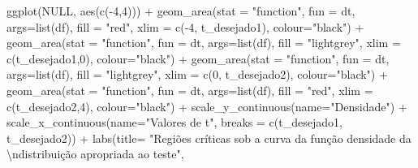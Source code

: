 \documentclass[
]{book}
\newenvironment{Shaded}{\begin{snugshade}}{\end{snugshade}}
\newcommand{\AttributeTok}[1]{\textcolor[rgb]{0.77,0.63,0.00}{#1}}
\newcommand{\ConstantTok}[1]{\textcolor[rgb]{0.00,0.00,0.00}{#1}}
\newcommand{\DecValTok}[1]{\textcolor[rgb]{0.00,0.00,0.81}{#1}}
\newcommand{\FunctionTok}[1]{\textcolor[rgb]{0.00,0.00,0.00}{#1}}
\newcommand{\NormalTok}[1]{#1}
\newcommand{\SpecialCharTok}[1]{\textcolor[rgb]{0.00,0.00,0.00}{#1}}
\newcommand{\StringTok}[1]{\textcolor[rgb]{0.31,0.60,0.02}{#1}}
\begin{document}
\begin{Shaded}
\begin{Highlighting}[]
\FunctionTok{ggplot}\NormalTok{(}\ConstantTok{NULL}\NormalTok{, }\FunctionTok{aes}\NormalTok{(}\FunctionTok{c}\NormalTok{(}\SpecialCharTok{{-}}\DecValTok{4}\NormalTok{,}\DecValTok{4}\NormalTok{))) }\SpecialCharTok{+}
  \FunctionTok{geom\_area}\NormalTok{(}\AttributeTok{stat =} \StringTok{"function"}\NormalTok{, }
            \AttributeTok{fun =}\NormalTok{ dt,}
            \AttributeTok{args=}\FunctionTok{list}\NormalTok{(df), }
            \AttributeTok{fill =} \StringTok{"red"}\NormalTok{, }
            \AttributeTok{xlim =} \FunctionTok{c}\NormalTok{(}\SpecialCharTok{{-}}\DecValTok{4}\NormalTok{, t\_desejado1),}
            \AttributeTok{colour=}\StringTok{"black"}\NormalTok{) }\SpecialCharTok{+}
  \FunctionTok{geom\_area}\NormalTok{(}\AttributeTok{stat =} \StringTok{"function"}\NormalTok{, }
            \AttributeTok{fun =}\NormalTok{ dt, }
            \AttributeTok{args=}\FunctionTok{list}\NormalTok{(df), }
            \AttributeTok{fill =} \StringTok{"lightgrey"}\NormalTok{, }
            \AttributeTok{xlim =} \FunctionTok{c}\NormalTok{(t\_desejado1,}\DecValTok{0}\NormalTok{),}
            \AttributeTok{colour=}\StringTok{"black"}\NormalTok{) }\SpecialCharTok{+}
  \FunctionTok{geom\_area}\NormalTok{(}\AttributeTok{stat =} \StringTok{"function"}\NormalTok{, }
            \AttributeTok{fun =}\NormalTok{ dt, }
            \AttributeTok{args=}\FunctionTok{list}\NormalTok{(df), }
            \AttributeTok{fill =} \StringTok{"lightgrey"}\NormalTok{, }
            \AttributeTok{xlim =} \FunctionTok{c}\NormalTok{(}\DecValTok{0}\NormalTok{, t\_desejado2),}
            \AttributeTok{colour=}\StringTok{"black"}\NormalTok{) }\SpecialCharTok{+}
  \FunctionTok{geom\_area}\NormalTok{(}\AttributeTok{stat =} \StringTok{"function"}\NormalTok{, }
            \AttributeTok{fun =}\NormalTok{ dt, }
            \AttributeTok{args=}\FunctionTok{list}\NormalTok{(df), }
            \AttributeTok{fill =} \StringTok{"red"}\NormalTok{, }
            \AttributeTok{xlim =} \FunctionTok{c}\NormalTok{(t\_desejado2,}\DecValTok{4}\NormalTok{),}
            \AttributeTok{colour=}\StringTok{"black"}\NormalTok{) }\SpecialCharTok{+}
  \FunctionTok{scale\_y\_continuous}\NormalTok{(}\AttributeTok{name=}\StringTok{"Densidade"}\NormalTok{) }\SpecialCharTok{+}
  \FunctionTok{scale\_x\_continuous}\NormalTok{(}\AttributeTok{name=}\StringTok{"Valores de t"}\NormalTok{, }\AttributeTok{breaks =} \FunctionTok{c}\NormalTok{(t\_desejado1, t\_desejado2))  }\SpecialCharTok{+}
  \FunctionTok{labs}\NormalTok{(}\AttributeTok{title=} 
         \StringTok{"Regiões críticas sob a curva da função densidade da }\SpecialCharTok{\textbackslash{}n}\StringTok{distribuição apropriada ao teste"}\NormalTok{, }

\end{Highlighting}
\end{Shaded}
\end{document}

